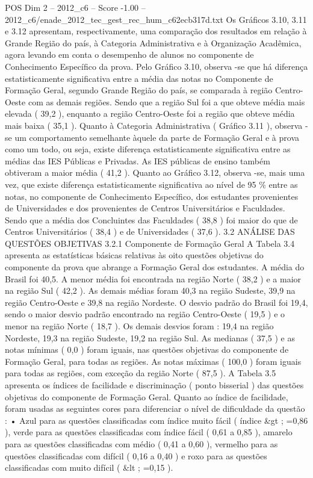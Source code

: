 \begin{textsample}{POS Dim 2 – 2012\_c6 – Score -1.00 – 2012\_c6/enade\_2012\_tec\_gest\_rec\_hum\_c62ecb317d.txt}
Os Gráficos 3.10, 3.11 e 3.12 apresentam, respectivamente, uma comparação dos resultados em relação à Grande Região do país, à Categoria Administrativa e à Organização Acadêmica, agora levando em conta o desempenho de alunos no componente de Conhecimento Específico da prova.
Pelo Gráfico 3.10, observa -se que há diferença estatisticamente significativa entre a média das notas no Componente de Formação Geral, segundo Grande Região do país, se comparada à região Centro-Oeste com as demais regiões.
Sendo que a região Sul foi a que obteve média mais elevada ( 39,2 ), enquanto a região Centro-Oeste foi a região que obteve média mais baixa ( 35,1 ).
Quanto à Categoria Administrativa ( Gráfico 3.11 ), observa -se um comportamento semelhante àquele da parte de Formação Geral e à prova como um todo, ou seja, existe diferença estatisticamente significativa entre as médias das IES Públicas e Privadas.
As IES públicas de ensino também obtiveram a maior média ( 41,2 ).
Quanto ao Gráfico 3.12, observa -se, mais uma vez, que existe diferença estatisticamente significativa ao nível de 95 \% entre as notas, no componente de Conhecimento Específico, dos estudantes provenientes de Universidades e dos provenientes de Centros Universitários e Faculdades.
Sendo que a média dos Concluintes das Faculdades ( 38,8 ) foi maior do que de Centros Universitários ( 38,4 ) e de Universidades ( 37,6 ). 3.2 ANÁLISE DAS QUESTÕES OBJETIVAS 3.2.1 Componente de Formação Geral A Tabela 3.4 apresenta as estatísticas básicas relativas às oito questões objetivas do componente da prova que abrange a Formação Geral dos estudantes.
A média do Brasil foi 40,5.
A menor média foi encontrada na região Norte ( 38,2 ) e a maior na região Sul ( 42,2 ).
As demais médias foram 40,3 na região Sudeste, 39,9 na região Centro-Oeste e 39,8 na região Nordeste.
O desvio padrão do Brasil foi 19,4, sendo o maior desvio padrão encontrado na região Centro-Oeste ( 19,5 ) e o menor na região Norte ( 18,7 ).
Os demais desvios foram : 19,4 na região Nordeste, 19,3 na região Sudeste, 19,2 na região Sul.
As medianas ( 37,5 ) e as notas mínimas ( 0,0 ) foram iguais, nas questões objetivas do componente de Formação Geral, para todas as regiões.
As notas máximas ( 100,0 ) foram iguais para todas as regiões, com exceção da região Norte ( 87,5 ).
A Tabela 3.5 apresenta os índices de facilidade e discriminação ( ponto bisserial ) das questões objetivas do componente de Formação Geral.
Quanto ao índice de facilidade, foram usadas as seguintes cores para diferenciar o nível de dificuldade da questão : • Azul para as questões classificadas com índice muito fácil ( índice \&gt ; =0,86 ), verde para as questões classificadas com índice fácil ( 0,61 a 0,85 ), amarelo para as questões classificadas com médio ( 0,41 a 0,60 ), vermelho para as questões classificadas com difícil ( 0,16 a 0,40 ) e roxo para as questões classificadas com muito difícil ( \&lt ; =0,15 ).

\end{textsample}

